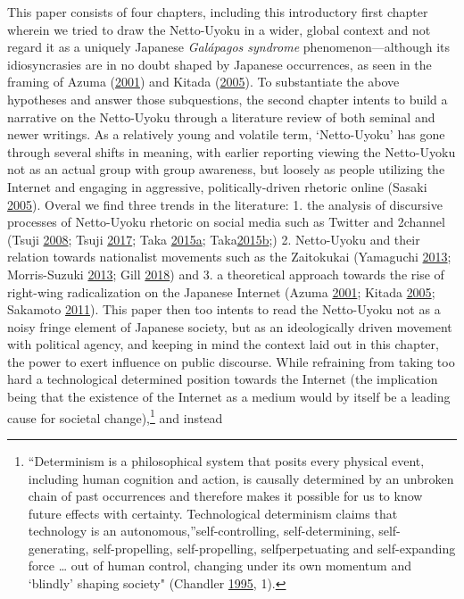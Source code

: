 \documentclass[10pt,british,A4paper,twoside]{memoir}
\begin{document}
This paper consists of four chapters, including this introductory first
chapter wherein we tried to draw the Netto-Uyoku in a wider, global
context and not regard it as a uniquely Japanese \emph{Galápagos
syndrome} phenomenon—although its idiosyncrasies are in no doubt shaped
by Japanese occurrences, as seen in the framing of Azuma
(\protect\hyperlink{ref-azuma_otaku:_2001}{2001}) and Kitada
(\protect\hyperlink{ref-kitada_eng:_2005}{2005}). To substantiate the above
hypotheses and answer those subquestions, the second chapter intents to
build a narrative on the Netto-Uyoku through a literature review of both
seminal and newer writings. As a relatively young and volatile term,
`Netto-Uyoku' has gone through several shifts in meaning, with earlier
reporting viewing the Netto-Uyoku not as an actual group with group
awareness, but loosely as people utilizing the Internet and engaging in
aggressive, politically-driven rhetoric online (Sasaki
\protect\hyperlink{ref-sasaki_netto-uyoku_2005}{2005}). Overal we find
three trends in the literature: 1. the analysis of discursive processes
of Netto-Uyoku rhetoric on social media such as Twitter and 2channel {(}Tsuji
\protect\hyperlink{ref-tsuji_eng:_2008}{2008}; Tsuji \protect\hyperlink{ref-tsuji_eng._2017}{2017};
Taka \protect\hyperlink{ref-taka_twitter_2015}{2015}\protect\hyperlink{ref-taka_twitter_2015}{a};
Taka\protect\hyperlink{ref-taka_twitter_2015-1}{2015}\protect\hyperlink{ref-taka_twitter_2015-1}{b};{)} 2. Netto-Uyoku and
their relation towards nationalist movements such as the Zaitokukai
(Yamaguchi \protect\hyperlink{ref-yamaguchi_xenophobia_2013}{2013};
Morris-Suzuki \protect\hyperlink{ref-morris-suzuki_freedom_2013}{2013};
Gill \protect\hyperlink{ref-gill_nativist_2018}{2018}) and 3. a
theoretical approach towards the rise of right-wing radicalization on
the Japanese Internet (Azuma
\protect\hyperlink{ref-azuma_otaku:_2001}{2001}; Kitada
\protect\hyperlink{ref-kitada_eng:_2005}{2005}; Sakamoto
\protect\hyperlink{ref-sakamoto_koreans_2011}{2011}). This paper then
too intents to read the Netto-Uyoku not as a noisy fringe element of
Japanese society, but as an ideologically driven movement with political
agency, and keeping in mind the context laid out in this chapter, the
power to exert influence on public discourse. While refraining from
taking too hard a technological determined position towards the Internet
(the implication being that the existence of the Internet as a medium
would by itself be a leading cause for societal change),\footnote{``Determinism
  is a philosophical system that posits every physical event, including
  human cognition and action, is causally determined by an unbroken
  chain of past occurrences and therefore makes it possible for us to
  know future effects with certainty. Technological determinism claims
  that technology is an autonomous,''self-controlling, self-determining,
  self-generating, self-propelling, self-propelling, selfperpetuating
  and self-expanding force \ldots{} out of human control, changing under
  its own momentum and `blindly' shaping society" (Chandler
  \protect\hyperlink{ref-chandler_act_1995}{1995}, 1).} and instead
\end{document}
